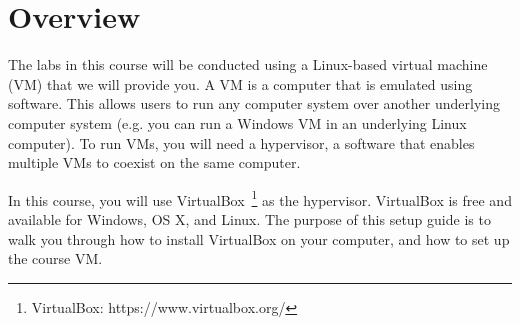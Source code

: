 \documentclass[11pt]{article}
\begin{document}
\maketitle \thispagestyle{fancy}



\section{Overview}
\label{sec:overview}
The labs in this course will be conducted using a Linux-based virtual machine (VM) that we will provide you. A VM is a computer that is emulated using software. This allows users to run any computer system over another underlying computer system (e.g. you can run a Windows VM in an underlying Linux computer). To run VMs, you will need a hypervisor, a software that enables multiple VMs to coexist on the same computer.

In this course, you will use VirtualBox~\footnote{VirtualBox: https://www.virtualbox.org/} as the hypervisor. VirtualBox is free and available for Windows, OS X, and Linux. The purpose of this setup guide is to walk you through how to install VirtualBox on your computer, and how to set up the course VM.





\end{document}
